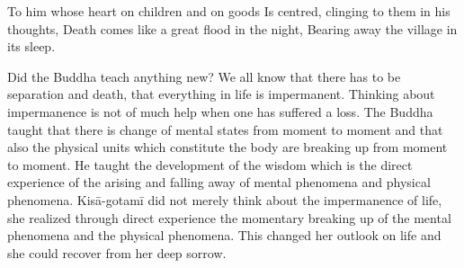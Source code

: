 \documentclass{book}
\begin{document}
To him whose heart on children and on goods Is centred, clinging to them
in his thoughts, Death comes like a great flood in the night, Bearing
away the village in its sleep.

Did the Buddha teach anything new? We all know that there has to be
separation and death, that everything in life is impermanent. Thinking
about impermanence is not of much help when one has suffered a loss. The
Buddha taught that there is change of mental states from moment to
moment and that also the physical units which consti­tute the body are
breaking up from moment to moment. He taught the development of the
wisdom which is the direct experience of the arising and falling away of
mental phenomena and physical phenomena. Kisā-gotamī did not merely
think about the impermanence of life, she realized through direct
experience the momentary break­ing up of the mental phenomena and the
physical phenomena. This changed her outlook on life and she could
recover from her deep sorrow.
\end{document}
